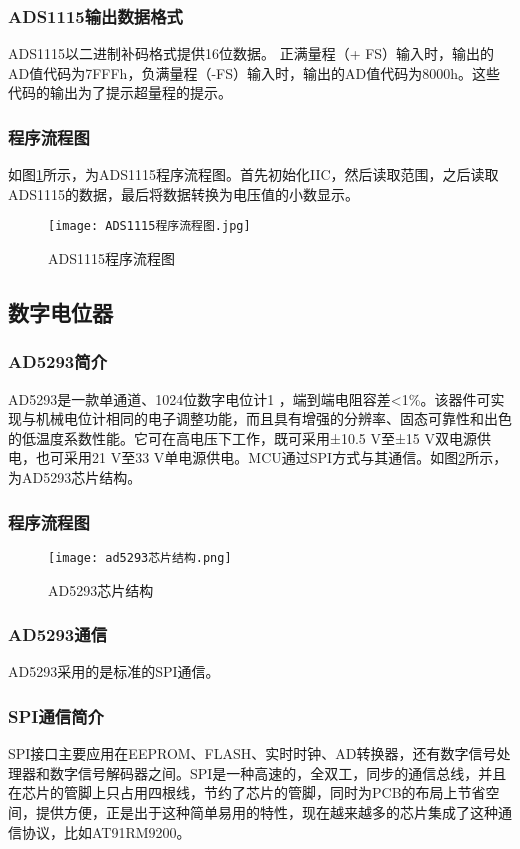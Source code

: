 \documentclass[lang=cn,11pt,a4paper]{elegantpaper}
\begin{document}
\subsubsection{ADS1115输出数据格式}
ADS1115以二进制补码格式提供16位数据。 正满量程（+ FS）输入时，输出的AD值代码为7FFFh，负满量程（-FS）输入时，输出的AD值代码为8000h。这些代码的输出为了提示超量程的提示。

\subsubsection{程序流程图}
如图\ref{fig:ADS1115程序流程图}所示，为ADS1115程序流程图。首先初始化IIC，然后读取范围，之后读取ADS1115的数据，最后将数据转换为电压值的小数显示。
\begin{figure}[!htb]
  \centering
  \texttt{[image: ADS1115程序流程图.jpg]}
  \caption{ADS1115程序流程图}
  \label{fig:ADS1115程序流程图}
\end{figure}

\subsection{数字电位器}
\subsubsection{AD5293简介}
AD5293是一款单通道、1024位数字电位计1 ，端到端电阻容差<1\%。该器件可实现与机械电位计相同的电子调整功能，而且具有增强的分辨率、固态可靠性和出色的低温度系数性能。它可在高电压下工作，既可采用±10.5 V至±15 V双电源供电，也可采用21 V至33 V单电源供电。MCU通过SPI方式与其通信。如图\ref{fig:ad5293芯片结构}所示，为AD5293芯片结构。
\subsubsection{程序流程图}
\begin{figure}[!htb]
  \centering
  \texttt{[image: ad5293芯片结构.png]}
  \caption{AD5293芯片结构}
  \label{fig:ad5293芯片结构}
\end{figure}

\subsubsection{AD5293通信}
AD5293采用的是标准的SPI通信。
\subsubsection{SPI通信简介}
SPI接口主要应用在EEPROM、FLASH、实时时钟、AD转换器，还有数字信号处理器和数字信号解码器之间。SPI是一种高速的，全双工，同步的通信总线，并且在芯片的管脚上只占用四根线，节约了芯片的管脚，同时为PCB的布局上节省空间，提供方便，正是出于这种简单易用的特性，现在越来越多的芯片集成了这种通信协议，比如AT91RM9200。
\end{document}
